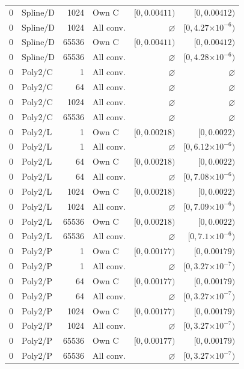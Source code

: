 \begin{longtable}{llrlrr}
0 & Spline/D & 1024 & Own C & $[0, 0.00411)$ & $[0, 0.00412)$ \\
0 & Spline/D & 1024 & All conv. & $\varnothing$ & $[0, 4.27\mathord{\times}10^{-6})$ \\
0 & Spline/D & 65536 & Own C & $[0, 0.00411)$ & $[0, 0.00412)$ \\
0 & Spline/D & 65536 & All conv. & $\varnothing$ & $[0, 4.28\mathord{\times}10^{-6})$ \\
0 & Poly2/C & 1 & All conv. & $\varnothing$ & $\varnothing$ \\
0 & Poly2/C & 64 & All conv. & $\varnothing$ & $\varnothing$ \\
0 & Poly2/C & 1024 & All conv. & $\varnothing$ & $\varnothing$ \\
0 & Poly2/C & 65536 & All conv. & $\varnothing$ & $\varnothing$ \\
0 & Poly2/L & 1 & Own C & $[0, 0.00218)$ & $[0, 0.0022)$ \\
0 & Poly2/L & 1 & All conv. & $\varnothing$ & $[0, 6.12\mathord{\times}10^{-6})$ \\
0 & Poly2/L & 64 & Own C & $[0, 0.00218)$ & $[0, 0.0022)$ \\
0 & Poly2/L & 64 & All conv. & $\varnothing$ & $[0, 7.08\mathord{\times}10^{-6})$ \\
0 & Poly2/L & 1024 & Own C & $[0, 0.00218)$ & $[0, 0.0022)$ \\
0 & Poly2/L & 1024 & All conv. & $\varnothing$ & $[0, 7.09\mathord{\times}10^{-6})$ \\
0 & Poly2/L & 65536 & Own C & $[0, 0.00218)$ & $[0, 0.0022)$ \\
0 & Poly2/L & 65536 & All conv. & $\varnothing$ & $[0, 7.1\mathord{\times}10^{-6})$ \\
0 & Poly2/P & 1 & Own C & $[0, 0.00177)$ & $[0, 0.00179)$ \\
0 & Poly2/P & 1 & All conv. & $\varnothing$ & $[0, 3.27\mathord{\times}10^{-7})$ \\
0 & Poly2/P & 64 & Own C & $[0, 0.00177)$ & $[0, 0.00179)$ \\
0 & Poly2/P & 64 & All conv. & $\varnothing$ & $[0, 3.27\mathord{\times}10^{-7})$ \\
0 & Poly2/P & 1024 & Own C & $[0, 0.00177)$ & $[0, 0.00179)$ \\
0 & Poly2/P & 1024 & All conv. & $\varnothing$ & $[0, 3.27\mathord{\times}10^{-7})$ \\
0 & Poly2/P & 65536 & Own C & $[0, 0.00177)$ & $[0, 0.00179)$ \\
0 & Poly2/P & 65536 & All conv. & $\varnothing$ & $[0, 3.27\mathord{\times}10^{-7})$ \\

\end{longtable}

